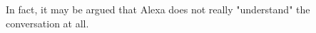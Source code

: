 \documentclass[11pt]{article}
\begin{document}
In fact, it may be argued that Alexa does not really "understand" the conversation at all.
\citet{turing1950computing}



\end{document}
